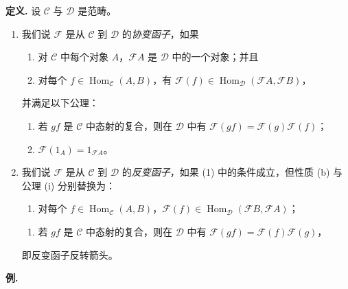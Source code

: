 \noindent\textbf{定义.} 设 $\mathcal C$ 与 $\mathcal D$ 是范畴。
\begin{enumerate}[label=(\arabic*)]
  \item 我们说 $\mathcal F$ 是从 $\mathcal C$ 到 $\mathcal D$ 的\emph{协变函子}，如果
  \begin{enumerate}[label=(\alph*)]
    \item 对 $\mathcal C$ 中每个对象 $A$，$\mathcal F A$ 是 $\mathcal D$ 中的一个对象；并且
    \item 对每个 $f\in\operatorname{Hom}_{\mathcal C}(A,B)$，有 $\mathcal F(f)\in\operatorname{Hom}_{\mathcal D}(\mathcal F A,\mathcal F B)$，
  \end{enumerate}
  并满足以下公理：
  \begin{enumerate}[label=(\roman*)]
    \item 若 $gf$ 是 $\mathcal C$ 中态射的复合，则在 $\mathcal D$ 中有 $\mathcal F(gf)=\mathcal F(g)\mathcal F(f)$；
    \item $\mathcal F(1_A)=1_{\mathcal F A}$。
  \end{enumerate}

  \item 我们说 $\mathcal F$ 是从 $\mathcal C$ 到 $\mathcal D$ 的\emph{反变函子}，如果 (1) 中的条件成立，但性质 (b) 与公理 (i) 分别替换为：
  \begin{enumerate}
    \item[(b')] 对每个 $f\in\operatorname{Hom}_{\mathcal C}(A,B)$，$\mathcal F(f)\in\operatorname{Hom}_{\mathcal D}(\mathcal F B,\mathcal F A)$；
  \end{enumerate}
  \begin{enumerate}
    \item[(i')] 若 $gf$ 是 $\mathcal C$ 中态射的复合，则在 $\mathcal D$ 中有 $\mathcal F(gf)=\mathcal F(f)\mathcal F(g)$，
  \end{enumerate}
  即反变函子反转箭头。
\end{enumerate}

\noindent\textbf{例.}

